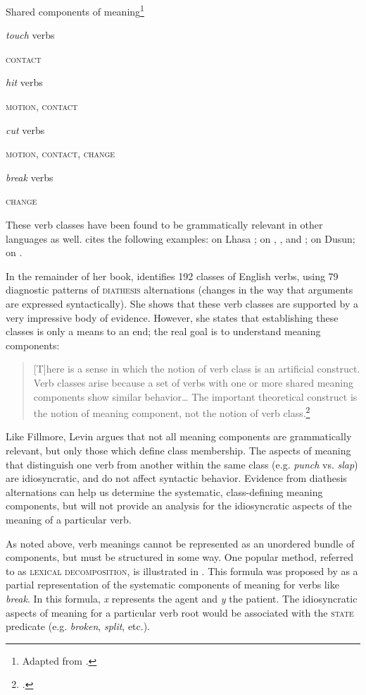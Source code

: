 \ea \label{ex:7.32}
{Shared components of meaning}\footnote{Adapted from \citet[268]{Saeed2009}.}\\
\parbox{4cm}{\textit{touch} verbs}  \textsc{contact}\\
\parbox{4cm}{\textit{hit} verbs}  \textsc{motion, contact}\\
\parbox{4cm}{\textit{cut} verbs}  \textsc{motion, contact, change}\\
\parbox{4cm}{\textit{break} verbs}  \textsc{change}
\z


These verb classes have been found to be grammatically relevant in other languages as well. \citet{Levin2015} cites the following examples: \citet{DeLancey1995,DeLancey2000} on Lhasa ; \citet{GuersselEtAl1985} on , , and ; \citet{Kroeger2010} on  Dusun; \citet{Vogel2005} on .

In the remainder of her book, \citet{Levin1993} identifies 192 classes of English verbs, using 79 diagnostic patterns of \textsc{diathesis} alternations (changes in the way that arguments are expressed syntactically). She shows that these verb classes are supported by a very impressive body of evidence. However, she states that establishing these classes is only a means to an end; the real goal is to understand meaning components:


\begin{quote}
{}[T]here is a sense in which the notion of verb class is an artificial construct. Verb classes arise because a set of verbs with one or more shared meaning components show similar behavior… The important theoretical construct is the notion of meaning component, not the notion of verb class.\footnote{\citet[9–10]{Levin1993}.}
\end{quote}


Like Fillmore, Levin argues that not all meaning components are grammatically relevant, but only those which define class membership. The aspects of meaning that distinguish one verb from another within the same class (e.g. \textit{punch} vs. \textit{slap}) are idiosyncratic, and do not affect syntactic behavior. Evidence from diathesis alternations can help us determine the systematic, class-defining meaning components, but will not provide an analysis for the idiosyncratic aspects of the meaning of a particular verb.

As noted above, verb meanings cannot be represented as an unordered bundle of components, but must be structured in some way. One popular method, referred to as \textsc{lexical decomposition}, is illustrated in . This formula was proposed by   \citet[109]{RappaportHovavLevin1998} as a partial representation of the systematic components of meaning for verbs like \textit{break}. In this formula, \textit{x} represents the agent and \textit{y} the patient. The idiosyncratic aspects of meaning for a particular verb root would be associated with the \textsc{state} predicate (e.g. \textit{broken}, \textit{split}, etc.).


